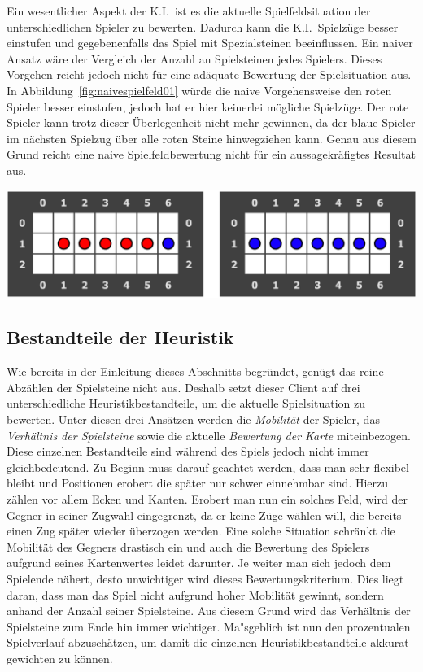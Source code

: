 Ein wesentlicher Aspekt der K.I.\ ist es die aktuelle Spielfeldsituation der unterschiedlichen Spieler zu bewerten.
Dadurch kann die K.I.\ Spielz\"uge besser einstufen und gegebenenfalls das Spiel mit Spezialsteinen beeinflussen.
Ein naiver Ansatz w\"are der Vergleich der Anzahl an Spielsteinen jedes Spielers.
Dieses Vorgehen reicht jedoch nicht f\"ur eine ad\"aquate Bewertung der Spielsituation aus.
In Abbildung~\ref{fig:naivespielfeld01} w\"urde die naive Vorgehensweise den roten Spieler besser einstufen, jedoch hat er hier keinerlei m\"ogliche Spielz\"uge.
Der rote Spieler kann trotz dieser \"Uberlegenheit nicht mehr gewinnen, da der blaue Spieler im n\"achsten Spielzug \"uber alle roten Steine hinwegziehen kann.
Genau aus diesem Grund reicht eine naive Spielfeldbewertung nicht f\"ur ein aussagekr\"afigtes Resultat aus.

\vspace{1em}
\begin{minipage}{\linewidth}
    \centering
    \includegraphics[width=0.6\linewidth]{pics/naive-game-situation}
    \label{fig:naivespielfeld01}
\end{minipage}

\subsection{Bestandteile der Heuristik}\label{subsec:bestandteile-der-heuristik}
Wie bereits in der Einleitung dieses Abschnitts begr\"undet, gen\"ugt das reine Abz\"ahlen der Spielsteine nicht aus.
Deshalb setzt dieser Client auf drei unterschiedliche Heuristikbestandteile, um die aktuelle Spielsituation zu bewerten.
Unter diesen drei Ans\"atzen werden die \emph{Mobilit\"at} der Spieler, das \emph{Verh\"altnis der Spielsteine} sowie die aktuelle \emph{Bewertung der Karte} miteinbezogen.
Diese einzelnen Bestandteile sind w\"ahrend des Spiels jedoch nicht immer gleichbedeutend.
Zu Beginn muss darauf geachtet werden, dass man sehr flexibel bleibt und Positionen erobert die sp\"ater nur schwer einnehmbar sind.
Hierzu z\"ahlen vor allem Ecken und Kanten.
Erobert man nun ein solches Feld, wird der Gegner in seiner Zugwahl eingegrenzt, da er keine Z\"uge w\"ahlen will, die bereits einen Zug sp\"ater wieder \"uberzogen werden.
Eine solche Situation schr\"ankt die Mobilit\"at des Gegners drastisch ein und auch die Bewertung des Spielers aufgrund seines Kartenwertes leidet darunter.
Je weiter man sich jedoch dem Spielende n\"ahert, desto unwichtiger wird dieses Bewertungskriterium.
Dies liegt daran, dass man das Spiel nicht aufgrund hoher Mobilit\"at gewinnt, sondern anhand der Anzahl seiner Spielsteine.
Aus diesem Grund wird das Verh\"altnis der Spielsteine zum Ende hin immer wichtiger.
Ma"sgeblich ist nun den prozentualen Spielverlauf abzusch\"atzen, um damit die einzelnen Heuristikbestandteile akkurat gewichten zu k\"onnen.

